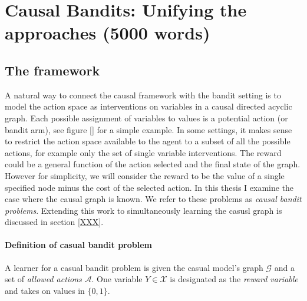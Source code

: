 \documentclass[11pt,a4paper,oneside]{book}
\begin{document}
\chapter*{Causal Bandits: Unifying the approaches (5000 words)}

\section*{The framework}
A natural way to connect the causal framework with the bandit setting is to model the action space as interventions on variables in a causal directed acyclic graph. Each possible assignment of variables to values is a potential action (or bandit arm), see figure \ref{} for a simple example. In some settings, it makes sense to restrict the action space available to the agent to a subset of all the possible actions, for example only the set of single variable interventions. The reward could be a general function of the action selected and the final state of the graph. However for simplicity, we will consider the reward to be the value of a single specified node minus the cost of the selected action. In this thesis I examine the case where the causal graph is known. We refer to these problems as \emph{causal bandit problems}.  Extending this work to simultaneously learning the casusl graph is discussed in section \ref{XXX}.

\subsubsection*{Definition of casual bandit problem} 
A learner for a casual bandit problem is given the casual model's graph $\mathcal{G}$ and a set of \emph{allowed actions} $\mathcal{A}$.
One variable $Y \in \mathcal{X}$ is designated as the \emph{reward variable} and takes on values in $\{0, 1\}$.
\end{document}
